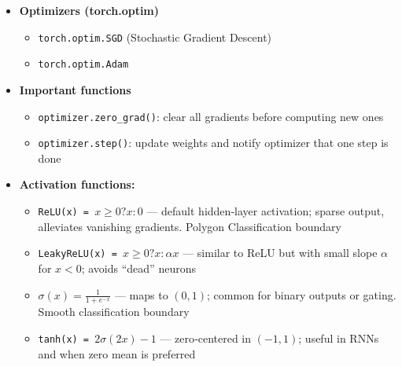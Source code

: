 \documentclass[8pt,twocolumn]{article}
\begin{document}
\begin{itemize}
    \setlength{\itemsep}{0pt}
    \setlength{\parskip}{0pt}
    \item \textbf{Optimizers (torch.optim)}\vspace{-0.6em}
      \begin{itemize}
        \setlength{\itemsep}{0pt}
        \setlength{\parskip}{0pt}
        \item \texttt{torch.optim.SGD} (Stochastic Gradient Descent)
        \item \texttt{torch.optim.Adam}
      \end{itemize}\vspace{-0.4em}
    \item \textbf{Important functions}\vspace{-0.6em}
      \begin{itemize}
        \setlength{\itemsep}{0pt}
        \setlength{\parskip}{0pt}
        \item \texttt{optimizer.zero\_grad()}: clear all gradients before computing new ones
        \item \texttt{optimizer.step()}: update weights and notify optimizer that one step is done
      \end{itemize}\vspace{-0.2em}
      \item \textbf{Activation functions:}\vspace{-0.2em}
      \begin{itemize}
        \setlength{\itemsep}{0pt}
        \setlength{\parskip}{0pt}
        \item \texttt{ReLU(x) = $x \ge 0 ? x : 0$}  
          — default hidden‐layer activation; sparse output, alleviates vanishing gradients. Polygon Classification boundary
        \item \texttt{LeakyReLU(x) = $x \ge 0 ? x : \alpha x$}  
          — similar to ReLU but with small slope $\alpha$ for $x<0$; avoids “dead” neurons
        \item \texttt{$\sigma(x) = \frac1{1+e^{-x}}$}  
          — maps to $(0,1)$; common for binary outputs or gating. Smooth classification boundary
        \item \texttt{tanh(x) = $2\sigma(2x)-1$}  
          — zero‐centered in $(-1,1)$; useful in RNNs and when zero mean is preferred
      \end{itemize}
      \vspace{-0.6em}
  \end{itemize}
  \vspace{-0.6em}
\end{document}
